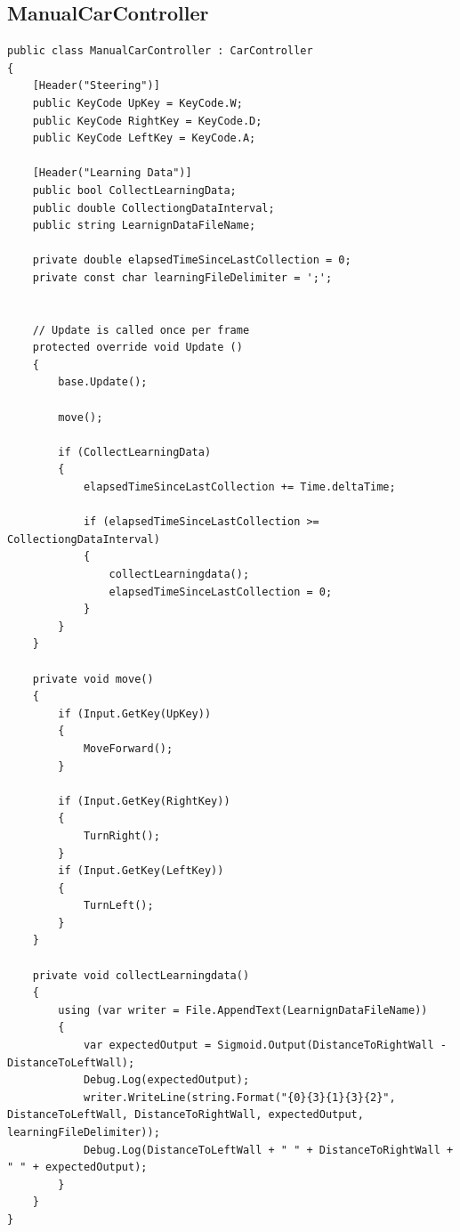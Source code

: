 \documentclass[12pt,a4paper]{article}
\begin{document}
	\subsection{ManualCarController}
	\begin{lstlisting}
public class ManualCarController : CarController
{
    [Header("Steering")]
    public KeyCode UpKey = KeyCode.W;
    public KeyCode RightKey = KeyCode.D;
    public KeyCode LeftKey = KeyCode.A;

    [Header("Learning Data")]
    public bool CollectLearningData;
    public double CollectiongDataInterval;
    public string LearnignDataFileName;

    private double elapsedTimeSinceLastCollection = 0;
    private const char learningFileDelimiter = ';';


    // Update is called once per frame
    protected override void Update ()
    {
        base.Update();

        move();

        if (CollectLearningData)
        {
            elapsedTimeSinceLastCollection += Time.deltaTime;

            if (elapsedTimeSinceLastCollection >= CollectiongDataInterval)
            {
                collectLearningdata();
                elapsedTimeSinceLastCollection = 0;
            }
        }
    }

    private void move()
    {
        if (Input.GetKey(UpKey))
        {
            MoveForward();
        }

        if (Input.GetKey(RightKey))
        {
            TurnRight();
        }
        if (Input.GetKey(LeftKey))
        {
            TurnLeft();
        }
    }

    private void collectLearningdata()
    {
        using (var writer = File.AppendText(LearnignDataFileName))
        {
            var expectedOutput = Sigmoid.Output(DistanceToRightWall - DistanceToLeftWall);
            Debug.Log(expectedOutput);
            writer.WriteLine(string.Format("{0}{3}{1}{3}{2}", DistanceToLeftWall, DistanceToRightWall, expectedOutput, learningFileDelimiter));
            Debug.Log(DistanceToLeftWall + " " + DistanceToRightWall + " " + expectedOutput);
        }
    }
}
	\end{lstlisting}
	
\end{document}
